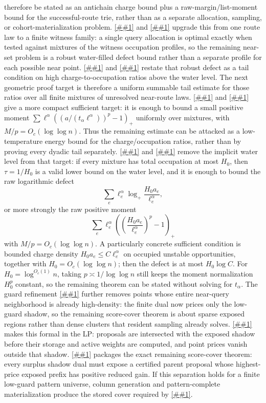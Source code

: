 \documentclass[10pt]{article}
\newcommand{\cref}[1]{\ref{##1}}
\newcommand{\Cref}[1]{\ref{##1}}
\theoremstyle{definition}
\begin{document}
therefore be stated as an antichain charge bound plus a raw-margin/list-moment
bound for the successful-route trie, rather than as a separate allocation,
sampling, or cohort-materialization problem.
\Cref{lem:finite-convex-minimax} and
\cref{lem:robust-waterfilled-minimax} upgrade this from one route law to a
finite witness family: a single query allocation is optimal exactly when tested
against mixtures of the witness occupation profiles, so the remaining near-set
problem is a robust water-filled defect bound rather than a separate profile
for each possible near point.
\Cref{lem:waterfilled-layercake} and
\cref{cor:robust-waterfilled-tail} restate that robust defect as a tail
condition on high charge-to-occupation ratios above the water level.  The next
geometric proof target is therefore a uniform summable tail estimate for those
ratios over all finite mixtures of unresolved near-route laws.
\Cref{lem:waterfilled-moment-certificate} and
\cref{cor:robust-waterfilled-moment} give a more compact sufficient target:
it is enough to bound a small positive moment
\(\sum \ell^\alpha((a/(t_\alpha\ell^\alpha))^p-1)_+\) uniformly over
mixtures, with \(M/p=O_c(\log\log n)\).  Thus the remaining estimate can be
attacked as a low-temperature energy bound for the charge/occupation ratios,
rather than by proving every dyadic tail separately.
\Cref{lem:waterfilled-raw-moment-certificate} and
\cref{cor:robust-waterfilled-raw-moment} remove the implicit water level from
that target: if every mixture has total occupation at most \(H_0\), then
\(\tau=1/H_0\) is a valid lower bound on the water level, and it is enough to
bound the raw logarithmic defect
\[
   \sum_e\ell^\alpha_e
   \log_+\frac{H_0a_e}{\ell^\alpha_e},
\]
or more strongly the raw positive moment
\[
   \sum_e\ell^\alpha_e
   \left(
   \left(\frac{H_0a_e}{\ell^\alpha_e}\right)^p-1
   \right)_+
\]
with \(M/p=O_c(\log\log n)\).  A particularly concrete sufficient condition
is bounded charge density \(H_0a_e\le C\ell^\alpha_e\) on occupied unstable
opportunities, together with \(H_0=O_c(\log\log n)\); then the defect is at
most \(H_0\log C\).  For \(H_0=\log^{O_c(1)}n\), taking
\(p\asymp1/\log\log n\) still keeps the moment normalization \(H_0^p\)
constant, so the remaining theorem can be stated without solving for
\(t_\alpha\).
The guard refinement
\cref{lem:low-guard-shadow} further removes points whose entire near-query
neighborhood is already high-density: the finite dual now prices only the
low-guard shadow, so the remaining score-cover theorem is about sparse exposed
regions rather than dense clusters that resident sampling already solves.
\Cref{cor:shadow-finite-pool-dual} makes this formal in the LP: proposals are
intersected with the exposed shadow before their storage and active weights are
computed, and point prices vanish outside that shadow.
\Cref{lem:shadow-price-density-compiler} packages the exact remaining
score-cover theorem: every surplus shadow dual must expose a certified parent
proposal whose highest-price exposed prefix has positive reduced gain.  If this
separation holds for a finite low-guard pattern universe, column generation and
pattern-complete materialization produce the stored cover required by
\cref{asm:weak-offline-score-cover}.
\end{document}
